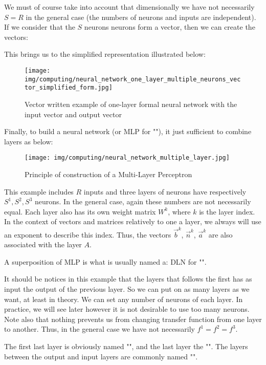 	We must of course take into account that dimensionally we have not necessarily $S=R$ in the general case (the numbers of neurons and inputs are independent). If we consider that the $S$ neurons neurons form a vector, then we can create the vectors:
	
	This brings us to the simplified representation illustrated below:
	\begin{figure}[H]
		\centering
		\texttt{[image: img/computing/neural\_network\_one\_layer\_multiple\_neurons\_vector\_simplified\_form.jpg]}
		\caption{Vector written example of one-layer formal neural network with the input vector and output vector}
	\end{figure}
	Finally, to build a neural network (or MLP for ""), it just sufficient to combine layers as below:
	\begin{figure}[H]
		\centering
		\texttt{[image: img/computing/neural\_network\_multiple\_layer.jpg]}
		\caption{Principle of construction of a Multi-Layer Perceptron}
	\end{figure}
	This example includes $R$ inputs and three layers of neurons have respectively $S^1,S^2,S^3$ neurons. In the general case, again these numbers are not necessarily equal. Each layer also has its own weight matrix $W^k$, where $k$ is the layer index. In the context of vectors and matrices relatively to one a layer, we always will use an exponent to describe this index. Thus, the vectors $\vec{b}^k$, $\vec{n}^k$, $\vec{a}^k$ are also associated with the layer $A$.
	
	\begin{tcolorbox}[title=Remark,colframe=black,arc=10pt]
	A superposition of MLP is what is usually named a: DLN for "".
	\end{tcolorbox}
	It should be notices in this example that the layers that follows the first has as input the output of the previous layer. So we can put on as many layers as we want, at least in theory. We can set any number of neurons of each layer. In practice, we will see later however it is not desirable to use too many neurons. Note also that nothing prevents us from changing transfer function from one layer to another. Thus, in the general case we have not necessarily $f^1=f^2=f^3$.
	
	The first last layer is obviously named "", and the last layer the "". The layers between the output and input layers are commonly named "".
	
